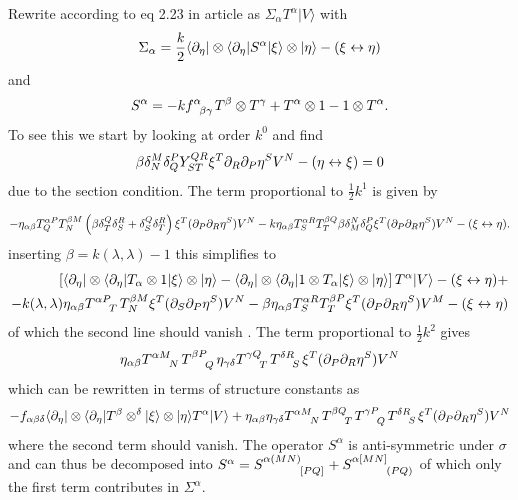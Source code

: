 \documentclass{article}
\begin{document}
\newpage 
Rewrite according to eq 2.23 in article as $\Sigma_\alpha T^\alpha|V\rangle$ with
\begin{equation}
    \Sigma_\alpha = \frac{k}{2}\langle\partial_\eta|\otimes \langle\partial_\eta|S^\alpha|\xi\rangle\otimes|\eta\rangle-(\xi\leftrightarrow\eta)
\end{equation}
and 
\begin{equation}
    S^\alpha = -kf\indices{^\alpha_{\beta\gamma}}T^\beta\otimes T^\gamma+T^\alpha\otimes 1-1\otimes T^\alpha. 
\end{equation}
To see this we start by looking at order $k^0$ and find 
\begin{equation}
    \beta\delta^M_N\delta^P_QY^{QR}_{ST}\xi^T\partial_R\partial_P\eta^SV^N-(\eta\leftrightarrow\xi) = 0 
\end{equation}
due to the section condition. The term proportional to $\frac{1}{2}k^1$ is given by 

\begin{equation}
    -\eta_{\alpha\beta}T^{\alpha P}_QT^{\beta M}_N\left(\beta\delta_T^Q\delta_S^R+\delta_S^Q\delta_T^R\right)\xi^T(\partial_P\partial_R\eta^S)V^N-k\eta_{\alpha\beta}T^{\alpha R}_S T^{\beta Q}_T\beta\delta_M^N\delta^P_Q\xi^T(\partial_P\partial_R\eta^S)V^N-(\xi\leftrightarrow\eta).
\end{equation}
inserting $\beta=k(\lambda,\lambda)-1$ this simplifies to 
\begin{align}
    \left[\langle\pd_\eta|\otimes\langle \pd_\eta|T_\alpha\otimes 1|\xi\rangle\otimes |\eta\rangle-\langle\pd_\eta|\otimes\langle \pd_\eta|1\otimes T_\alpha|\xi\rangle\otimes |\eta\rangle\right]T^\alpha |V\rangle-(\xi\leftrightarrow\eta)+\\
    -k(\lambda,\lambda)\eta_{\alpha\beta}T\indices{^{\alpha P}_T} T^{\beta M}_N\xi^T(\pd_S\pd_P\eta^S)V^N-\beta\eta_{\alpha\beta}T^{\alpha R}_{S}T^{\beta P}_T\xi^T(\pd_P\pd_R\eta^S)V^M-(\xi\leftrightarrow\eta)
\end{align}
of which the second line should vanish . The term proportional to $\frac{1}{2}k^2$ gives
\begin{equation}
    \eta_{\alpha\beta}T\indices{^{\alpha M}_N}T\indices{^{\beta P}_Q}\eta_{\gamma\delta}T\indices{^{\gamma Q}_T}T\indices{^{\delta R}_S}\xi^T(\pd_P\pd_R\eta^S)V^N
\end{equation}
which can be rewritten in terms of structure constants as 
\begin{equation}
    -f_{\alpha\beta\delta}\langle \pd_\eta|\otimes \langle \pd_\eta |T^\beta \otimes ^\delta |\xi\rangle\otimes|\eta\rangle T^\alpha |V\rangle+\eta_{\alpha\beta}\eta_{\gamma\delta}T\indices{^{\alpha M}_N}T\indices{^{\beta Q}_T}T\indices{^{\gamma P}_Q}T\indices{^{\delta R}_S}\xi^T(\pd_P\pd_R\eta^S)V^N
\end{equation}
where the second term should vanish.
The operator $S^\alpha$ is anti-symmetric under $\sigma$ and can thus be decomposed into $S^\alpha = S\indices{^{\alpha(MN)}_{[PQ]}}+S\indices{^{\alpha[MN]}_{(PQ)}}$ of which only the first term contributes in $\Sigma^\alpha$. 
\end{document}
